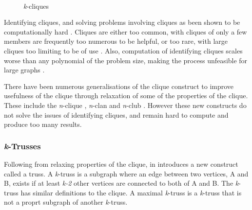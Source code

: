 \begin{figure}
  \centering
   ~  ~ 
  \caption{\emph{k}-cliques}
  \label{fig:cliques}
\end{figure}

Identifying cliques, and solving problems involving cliques as been shown to be computationally hard \cite{bomze99, trusses}. Cliques are either too common, with cliques of only a few members are frequently too numerous to be helpful, or too rare, with large cliques too limiting to be of use \cite{trusses}. Also, computation of identifying cliques scales worse than any polynomial of the problem size, making the process unfeasible for large graphs \cite{trusses, bron72}.

There have been numerous generalisations of the clique construct to improve usefulness of the clique through relaxation of some of the properties of the clique. These include the \emph{n}-clique \cite{luce50}, \emph{n}-clan \cite{alba73} and \emph{n}-club \cite{mokken79}. However these new constructs do not solve the issues of identifying cliques, and remain hard to compute and produce too many results.

\subsubsection{\emph{k}-Trusses}
Following from relaxing properties of the clique, \citeauthor{trusses} in \cite{trusses} introduces a new construct called a truss. A \emph{k}-truss is a subgraph where an edge between two vertices, A and B, exists if at least \emph{k-2} other vertices are connected to both of A and B. The \emph{k}-truss has similar definitions to the clique. A maximal \emph{k}-truss is a \emph{k}-truss that is not a proprt subgraph of another \emph{k}-truss.

